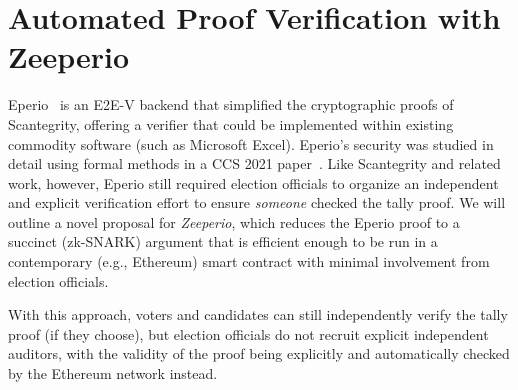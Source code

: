 \documentclass[runningheads]{llncs}
\begin{document}
\section*{Automated Proof Verification with Zeeperio}

Eperio~\cite{ECHA10} is an E2E-V backend that simplified the cryptographic proofs of Scantegrity, offering a verifier that could be implemented within existing commodity software (such as Microsoft Excel). Eperio's security was studied in detail using formal methods in a CCS 2021 paper~\cite{BDGR21}. Like Scantegrity and related work, however, Eperio still required election officials to organize an independent and explicit verification effort to ensure {\em someone} checked the tally proof. We will outline a novel proposal for {\em Zeeperio}, which reduces the Eperio proof to a succinct (zk-SNARK) argument that is efficient enough to be run in a contemporary (e.g., Ethereum) smart contract with minimal involvement from election officials.

With this approach, voters and candidates can still independently verify the tally proof (if they choose), but election officials do not recruit explicit independent auditors, with the validity of the proof being explicitly and automatically checked by the Ethereum network instead.

\clearpage

\end{document}
